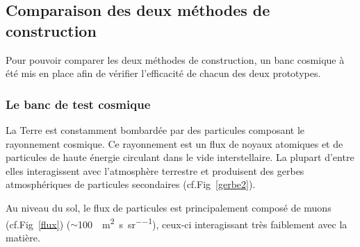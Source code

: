  \subsection{Comparaison des deux méthodes de construction}
 
 Pour pouvoir comparer les deux méthodes de construction, un banc cosmique à été mis en place afin de vérifier l'efficacité de chacun des deux prototypes.
 
 \subsubsection{Le banc de test cosmique}
 \label{banc}
 La Terre est constamment bombardée par des particules composant le rayonnement cosmique. Ce rayonnement est un flux de noyaux atomiques et de particules de haute énergie circulant dans le vide interstellaire. La plupart d'entre elles interagissent avec l'atmosphère terrestre et produisent des gerbes atmosphériques de particules secondaires (cf.Fig~\ref{gerbe2}).
 
 Au niveau du sol, le flux de particules est principalement composé de muons (cf.Fig~\ref{flux}) ($\sim$\SI{100}{\per\square\meter\per\second\per\steradian}), ceux-ci interagissant très faiblement avec la matière.
 
